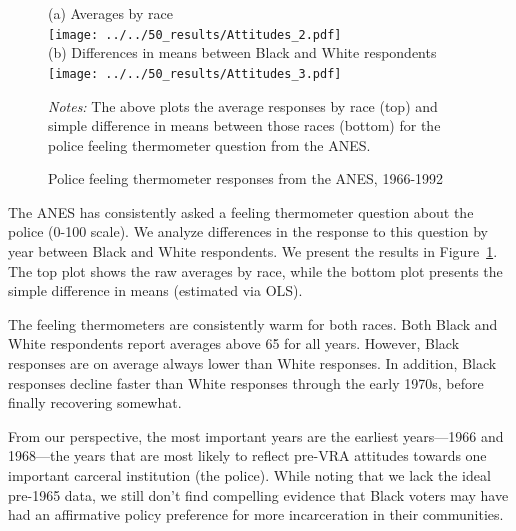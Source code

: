 \documentclass[12pt]{article}
\begin{document}
 \begin{figure}[h!]
   	\begin{center}
   	\caption{Police feeling thermometer responses from the ANES, 1966-1992}
   		\small \vspace*{.05in}
   		\smallskip
			(a) Averages by race \\
   			\texttt{[image: ../../50\_results/Attitudes\_2.pdf]} \\
				\smallskip \smallskip
				(b) Differences in means between Black and White respondents \\
   			\texttt{[image: ../../50\_results/Attitudes\_3.pdf]}\\
   		\label{figure_anes}
   		\end{center}
  	\scriptsize{\emph{Notes:} The above plots the average responses by race (top) and simple difference in means between those races (bottom) for the police feeling thermometer question from the ANES.}
   \end{figure} \normalsize



The ANES has consistently asked a feeling thermometer question about the police (0-100 scale).
We analyze differences in the response to this question by year between Black and White respondents.  We present the results in Figure~\ref{figure_anes}.  The top plot shows the raw averages by race, while the bottom plot presents the simple difference in means (estimated via OLS).

The feeling thermometers are consistently warm for both races.  Both Black and White respondents report averages above 65 for all years.  However, Black responses are on average always lower than White responses.  In addition, Black responses decline faster than White responses through the early 1970s, before finally recovering somewhat.

From our perspective, the most important years are the earliest years---1966 and 1968---the years that are most likely to reflect pre-VRA attitudes towards one important carceral institution (the police).  While noting that we lack the ideal pre-1965 data, we still don't find compelling evidence that Black voters may have had an affirmative policy preference for more incarceration in their communities.







\clearpage \newpage
\end{document}

